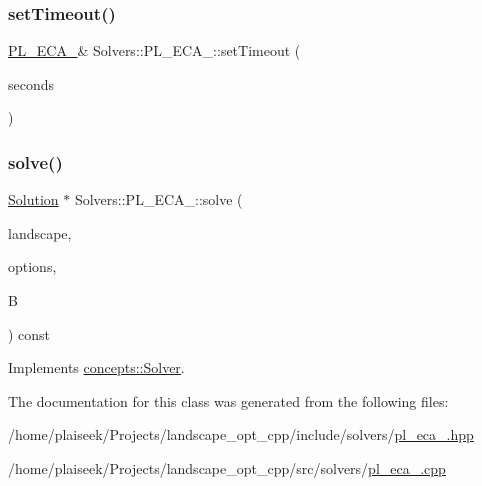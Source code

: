 \mbox{\label{class_solvers_1_1_p_l___e_c_a__2_a40ef2df054be492783836af74a3436b3}} 
\subsubsection{\texorpdfstring{set\+Timeout()}{setTimeout()}}
{\footnotesize\ttfamily \hyperlink{class_solvers_1_1_p_l___e_c_a__2}{P\+L\+\_\+\+E\+C\+A\+\_}\& Solvers\+::\+P\+L\+\_\+\+E\+C\+A\+\_\+::set\+Timeout (\begin{DoxyParamCaption}\item[{int}]{seconds }\end{DoxyParamCaption})\hspace{0.3cm}{\ttfamily [inline]}}

\mbox{\label{class_solvers_1_1_p_l___e_c_a__2_a07601fa43e0c530e7a66b1532a9e96a6}} 
\subsubsection{\texorpdfstring{solve()}{solve()}}
{\footnotesize\ttfamily \hyperlink{class_solution}{Solution} $\ast$ Solvers\+::\+P\+L\+\_\+\+E\+C\+A\+\_\+::solve (\begin{DoxyParamCaption}\item[{const \hyperlink{class_landscape}{Landscape} \&}]{landscape,  }\item[{const \hyperlink{class_restoration_plan}{Restoration\+Plan} \&}]{options,  }\item[{const double}]{B }\end{DoxyParamCaption}) const\hspace{0.3cm}{\ttfamily [virtual]}}



Implements \hyperlink{classconcepts_1_1_solver_af323ad29df1e7b87facd7dc007568c80}{concepts\+::\+Solver}.



The documentation for this class was generated from the following files\+:\begin{DoxyCompactItemize}
\item 
/home/plaiseek/\+Projects/landscape\+\_\+opt\+\_\+cpp/include/solvers/\hyperlink{pl__eca__2_8hpp}{pl\+\_\+eca\+\_.\+hpp}\item 
/home/plaiseek/\+Projects/landscape\+\_\+opt\+\_\+cpp/src/solvers/\hyperlink{pl__eca__2_8cpp}{pl\+\_\+eca\+\_.\+cpp}\end{DoxyCompactItemize}
